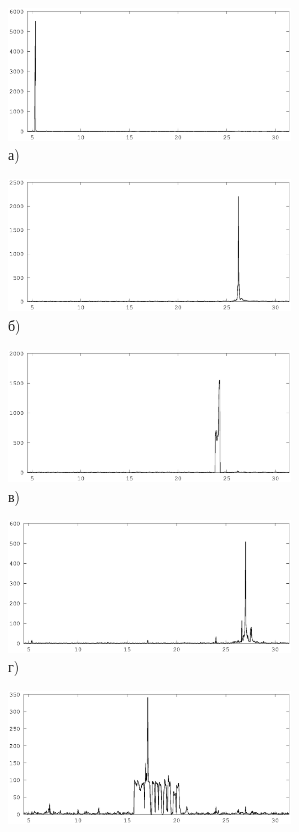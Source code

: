\documentclass[14pt,a4paper,oneside]{extarticle}
\begin{document}
	\begin{figure}[H]
	\centering

	\begin{subfigure}[b]{0.45 \textwidth}
		\centering
		\includegraphics[width=7.5cm]{all-freq-5-8.eps}	
		\caption*{а)}
	\end{subfigure}  
	\begin{subfigure}[b]{0.45 \textwidth}
		\centering
		\includegraphics[width=7.5cm]{all-freq-26-5.eps}	
		\caption*{б)}
	\end{subfigure}  
	\begin{subfigure}[b]{0.45 \textwidth}
		\centering
		\includegraphics[width=7.5cm]{all-freq-24-6.eps}	
		\caption*{в)}
	\end{subfigure}  
	\begin{subfigure}[b]{0.45 \textwidth}
		\centering
		\includegraphics[width=7.5cm]{all-freq-27-0-1.eps}	
		\caption*{г)}
	\end{subfigure}  
	\begin{subfigure}[b]{0.45 \textwidth}
		\centering
		\includegraphics[width=7.5cm]{all-freq-17-2-1.eps}	

\end{subfigure}
\end{figure}
\end{document}
